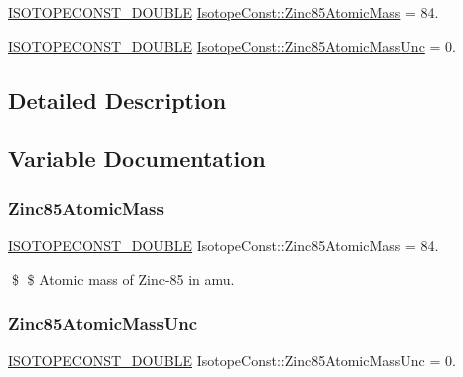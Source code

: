 \begin{DoxyCompactItemize}
\item 
\mbox{\hyperlink{group___isotope_const-_macros_ga8f45a7272ce02c0b4c65c44636ed719a}{I\+S\+O\+T\+O\+P\+E\+C\+O\+N\+S\+T\+\_\+\+D\+O\+U\+B\+LE}} \mbox{\hyperlink{group___isotope_const-_zinc-_zn85_gab8972732056e153bbb4dad2c236f81d4}{Isotope\+Const\+::\+Zinc85\+Atomic\+Mass}} = 84.
\item 
\mbox{\hyperlink{group___isotope_const-_macros_ga8f45a7272ce02c0b4c65c44636ed719a}{I\+S\+O\+T\+O\+P\+E\+C\+O\+N\+S\+T\+\_\+\+D\+O\+U\+B\+LE}} \mbox{\hyperlink{group___isotope_const-_zinc-_zn85_ga0d2919b8cca7b07a56f9fdec88cd3c6d}{Isotope\+Const\+::\+Zinc85\+Atomic\+Mass\+Unc}} = 0.
\end{DoxyCompactItemize}


\subsection{Detailed Description}


\subsection{Variable Documentation}
\mbox{\label{group___isotope_const-_zinc-_zn85_gab8972732056e153bbb4dad2c236f81d4}} 
\subsubsection{\texorpdfstring{Zinc85\+Atomic\+Mass}{Zinc85AtomicMass}}
{\footnotesize\ttfamily \mbox{\hyperlink{group___isotope_const-_macros_ga8f45a7272ce02c0b4c65c44636ed719a}{I\+S\+O\+T\+O\+P\+E\+C\+O\+N\+S\+T\+\_\+\+D\+O\+U\+B\+LE}} Isotope\+Const\+::\+Zinc85\+Atomic\+Mass = 84.}

\$ \$ Atomic mass of Zinc-\/85 in amu. \mbox{\label{group___isotope_const-_zinc-_zn85_ga0d2919b8cca7b07a56f9fdec88cd3c6d}} 
\subsubsection{\texorpdfstring{Zinc85\+Atomic\+Mass\+Unc}{Zinc85AtomicMassUnc}}
{\footnotesize\ttfamily \mbox{\hyperlink{group___isotope_const-_macros_ga8f45a7272ce02c0b4c65c44636ed719a}{I\+S\+O\+T\+O\+P\+E\+C\+O\+N\+S\+T\+\_\+\+D\+O\+U\+B\+LE}} Isotope\+Const\+::\+Zinc85\+Atomic\+Mass\+Unc = 0.}

